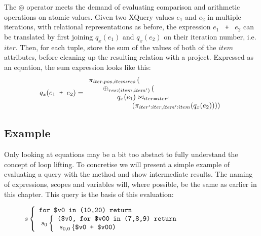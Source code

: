 The $\circledcirc$ operator meets the demand of evaluating comparison and arithmetic operations on atomic values.
Given two XQuery values $e_{1}$ and $e_{2}$ in multiple iterations, with relational representations as before,
the expression $e_{1}$ \texttt{ + } $e_{2}$ can be translated by first joining $q_{x}(e_{1})$ and $q_{x}(e_{2})$
on their iteration number, i.e. $iter$. Then, for each tuple, store the sum of the values of both of the $item$
attributes, before cleaning up the resulting relation with a project. Expressed as an equation, the sum expression looks like
this:
\begin{equation}
q_{x}(e_{1} \mbox{\texttt{ + }} e_{2}) =
\begin{array}{l}
\pi_{iter,pos,item:res}\left(\right. \\ \qquad
\oplus_{res:(item,item')}
\left( \right. \\ \qquad \qquad

	q_{x}(e_{1})
	\bowtie_{iter = iter'}
	 \\ \qquad \qquad \qquad
	\left.\left(\pi_{iter':iter, item':item}(q_{x}(e_{2}))
	\right)
\right)
\end{array}
\label{eq:ll:sumexpr}
\end{equation}

\subsection{Example}
\label{sect:translation:ll:example}

Only looking at equations may be a bit too abstact to fully understand the concept of loop lifting. To
concretise we will present a simple example of evaluating a query with the method and show intermediate results.
The naming of expressions, scopes and variables will, where possible, be the same as earlier in this chapter. This
query is the basis of this evaluation:

\begin{figure*}[h!]
\centering
\begin{math}
s\left\{
\begin{array}{l}
\mbox{\texttt{for \$v0 in (10,20) return}} \\ \;
s_{0}\left\{
\begin{array}{l}
\mbox{\texttt{(\$v0, for \$v00 in (7,8,9) return}} \\ \;
s_{0,0}\left\{ \mbox{\texttt{\$v0 + \$v00)}}\right.
\end{array}
\right.
\end{array}
\right.
\end{math}
\end{figure*}

